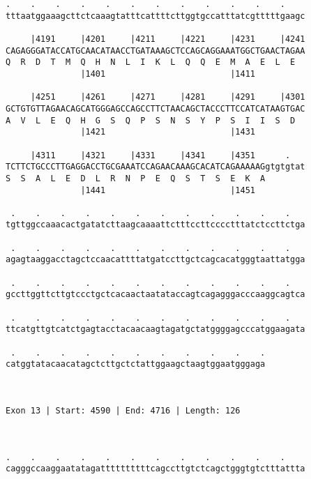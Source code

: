\documentclass{article}
\begin{document}
\begin{Verbatim}
.    .    .    .    .    .    .    .    .    .    .    .    
tttaatggaaagcttctcaaagtatttcattttcttggtgccatttatcgtttttgaagc
                                                            
     |4191     |4201     |4211     |4221     |4231     |4241
CAGAGGGATACCATGCAACATAACCTGATAAAGCTCCAGCAGGAAATGGCTGAACTAGAA
Q  R  D  T  M  Q  H  N  L  I  K  L  Q  Q  E  M  A  E  L  E  
               |1401                         |1411          
  
     |4251     |4261     |4271     |4281     |4291     |4301
GCTGTGTTAGAACAGCATGGGAGCCAGCCTTCTAACAGCTACCCTTCCATCATAAGTGAC
A  V  L  E  Q  H  G  S  Q  P  S  N  S  Y  P  S  I  I  S  D  
               |1421                         |1431          
  
     |4311     |4321     |4331     |4341     |4351      .   
TCTTCTGCCCTTGAGGACCTGCGAAATCCAGAACAAAGCACATCAGAAAAAGgtgtgtat
S  S  A  L  E  D  L  R  N  P  E  Q  S  T  S  E  K  A        
               |1441                         |1451          
  
 .    .    .    .    .    .    .    .    .    .    .    .   
tgttggccaaacactgatatcttaagcaaaattctttccttcccctttatctccttctga
                                                            
 .    .    .    .    .    .    .    .    .    .    .    .   
agagtaaggacctagctccaacattttatgatccttgctcagcacatgggtaattatgga
                                                            
 .    .    .    .    .    .    .    .    .    .    .    .   
gccttggttcttgtccctgctcacaactaatataccagtcagagggacccaaggcagtca
                                                            
 .    .    .    .    .    .    .    .    .    .    .    .   
ttcatgttgtcatctgagtacctacaacaagtagatgctatggggagcccatggaagata
                                                            
 .    .    .    .    .    .    .    .    .    .    .
catggtatacaacatagctcttgctctattggaagctaagtggaatgggaga
                                                    
                                                    
 
Exon 13 | Start: 4590 | End: 4716 | Length: 126



.    .    .    .    .    .    .    .    .    .    .    .    
cagggccaaggaatatagattttttttttcagccttgtctcagctgggtgtctttattta
                                                            

\end{Verbatim}
\end{document}
